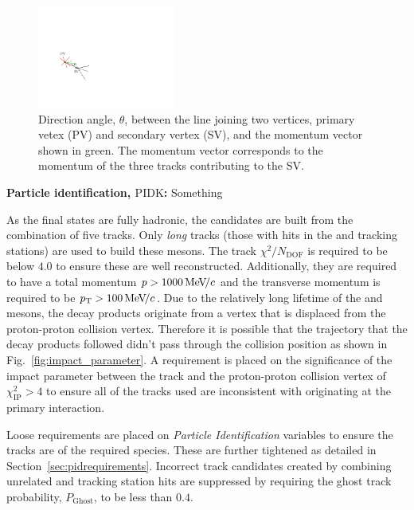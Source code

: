 \begin{description}
\begin{figure}[!h]
    \centering
    \includegraphics[width=0.4\textwidth]{figs/Selection/DIRA.pdf}
    \caption{Direction angle, $\theta$, between the line joining two vertices, primary vetex (PV) and secondary vertex (SV), and the momentum vector shown in green. The momentum vector corresponds to the momentum of the three tracks contributing to the SV. }
    \label{fig:dira}   
\end{figure}


\item \textbf{Particle identification, $\text{PIDK}$:} {\color{Red} Something }  
\end{description}


As the final states are fully hadronic, the candidates are built from the combination of five tracks. Only \emph{long} tracks (those with hits in the \velo and tracking stations) are used to build these mesons. The track $\chi^{2}/N_{\text{DOF}}$ is required to be below $4.0$ to ensure these are well reconstructed. Additionally, they are required to have a total momentum $\mbox{$p$} > 1000 {\mathrm{\,Me\kern -0.1em V\!/}c}$ and the transverse momentum is required to be $\mbox{$p_{\mathrm{ T}}$} > 100 {\mathrm{\,Me\kern -0.1em V\!/}c}$.
Due to the relatively long lifetime of the \Bp and \D mesons, the decay products originate from a vertex that is displaced from the proton-proton collision vertex. Therefore it is possible that the trajectory that the decay products followed didn't pass through the collision position as shown in Fig.~\ref{fig:impact_parameter}. A requirement is placed on the significance of the impact parameter between the track and the proton-proton collision vertex of $\chi^{2}_{\text{IP}} > 4$ to ensure all of the tracks used are inconsistent with originating at the primary interaction.  


Loose requirements are placed on \emph{Particle Identification} variables to ensure the tracks are of the required species. These are further tightened as detailed in Section~\ref{sec:pidrequirements}. Incorrect track candidates created by combining unrelated \velo and tracking station hits are suppressed by requiring the ghost track probability, $P_{\text{Ghost}}$, to be less than $0.4$. 

